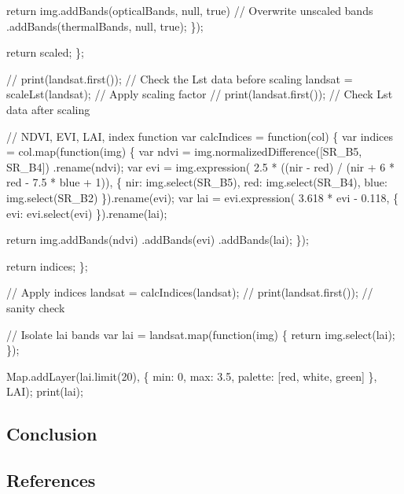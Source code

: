 \documentclass[
]{agujournal2019}
\newenvironment{Shaded}{\begin{snugshade}}{\end{snugshade}}
\newcommand{\NormalTok}[1]{\textcolor[rgb]{0.00,0.23,0.31}{#1}}
\begin{document}
\begin{Shaded}
\begin{Highlighting}[]
\NormalTok{    return img.addBands(opticalBands, null, true)  // Overwrite unscaled bands}
\NormalTok{      .addBands(thermalBands, null, true);}
\NormalTok{  \});}
  
\NormalTok{  return scaled;}
\NormalTok{\};}

\NormalTok{// print(landsat.first());  // Check the Lst data before scaling}
\NormalTok{landsat = scaleLst(landsat);  // Apply scaling factor}
\NormalTok{// print(landsat.first());  // Check Lst data after scaling}

\NormalTok{// NDVI, EVI, LAI, index function}
\NormalTok{var calcIndices = function(col) \{}
\NormalTok{  var indices = col.map(function(img) \{}
\NormalTok{    var ndvi = img.normalizedDifference([\textquotesingle{}SR\_B5\textquotesingle{}, \textquotesingle{}SR\_B4\textquotesingle{}])}
\NormalTok{      .rename(\textquotesingle{}ndvi\textquotesingle{});}
\NormalTok{    var evi = img.expression(}
\NormalTok{      \textquotesingle{}2.5 * ((nir {-} red) / (nir + 6 * red {-} 7.5 * blue + 1))\textquotesingle{},}
\NormalTok{      \{}
\NormalTok{        \textquotesingle{}nir\textquotesingle{}: img.select(\textquotesingle{}SR\_B5\textquotesingle{}),}
\NormalTok{        \textquotesingle{}red\textquotesingle{}: img.select(\textquotesingle{}SR\_B4\textquotesingle{}),}
\NormalTok{        \textquotesingle{}blue\textquotesingle{}: img.select(\textquotesingle{}SR\_B2\textquotesingle{})}
\NormalTok{      \}).rename(\textquotesingle{}evi\textquotesingle{});}
\NormalTok{    var lai = evi.expression(}
\NormalTok{      \textquotesingle{}3.618 * evi {-} 0.118\textquotesingle{}, }
\NormalTok{      \{}
\NormalTok{        \textquotesingle{}evi\textquotesingle{}: evi.select(\textquotesingle{}evi\textquotesingle{})}
\NormalTok{      \}).rename(\textquotesingle{}lai\textquotesingle{});}
      
\NormalTok{    return img.addBands(ndvi)}
\NormalTok{      .addBands(evi)}
\NormalTok{      .addBands(lai);}
\NormalTok{  \});}
  
\NormalTok{  return indices;}
\NormalTok{\};}

\NormalTok{// Apply indices}
\NormalTok{landsat = calcIndices(landsat);}
\NormalTok{// print(landsat.first());  // sanity check}

\NormalTok{// Isolate lai bands}
\NormalTok{var lai = landsat.map(function(img) \{}
\NormalTok{  return img.select(\textquotesingle{}lai\textquotesingle{});}
\NormalTok{\});}

\NormalTok{Map.addLayer(lai.limit(20), \{}
\NormalTok{  min: 0,}
\NormalTok{  max: 3.5,}
\NormalTok{  palette: [\textquotesingle{}red\textquotesingle{}, \textquotesingle{}white\textquotesingle{}, \textquotesingle{}green\textquotesingle{}]}
\NormalTok{\}, \textquotesingle{}LAI\textquotesingle{});}
\NormalTok{print(lai);}
\end{Highlighting}
\end{Shaded}

\subsection{Conclusion}\label{sec-conclusions}

\subsection*{References}\label{references}
\end{document}
